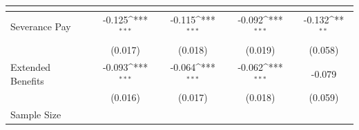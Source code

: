 {
\def\sym#1{\ifmmode^{#1}\else\(^{#1}\)\fi}
\begin{tabular}{l*{4}{c}}
\hline\hline
                    &&&&\\
\hline
Severance Pay       &      -0.125\sym{***}&      -0.115\sym{***}&      -0.092\sym{***}&      -0.132\sym{**} \\
                    &     (0.017)         &     (0.018)         &     (0.019)         &     (0.058)         \\
Extended Benefits   &      -0.093\sym{***}&      -0.064\sym{***}&      -0.062\sym{***}&      -0.079         \\
                    &     (0.016)         &     (0.017)         &     (0.018)         &     (0.059)         \\
\hline
Sample Size         &                     &                     &                     &                     \\
\hline\hline
\end{tabular}
}
